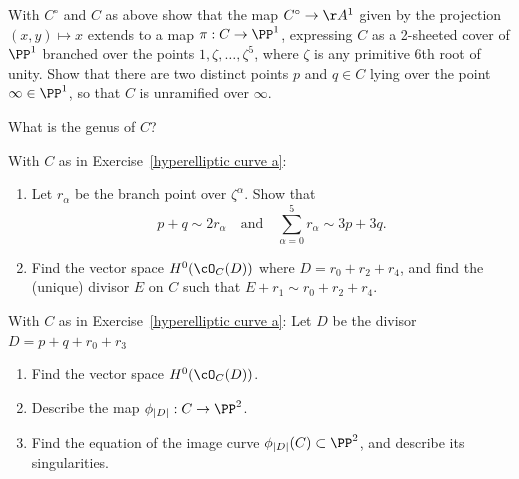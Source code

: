 \begin{exercise}\label{hyperelliptic curve a}
With $C^\circ$ and $C$  as above show  that the map $C^\circ \to \AA^1$ given by the projection $(x,y) \mapsto x$ extends to a map $\pi : C \to \PP^1$, expressing $C$ as a 2-sheeted cover of $\PP^1$ branched over the points $1, \zeta, \dots, \zeta^5$, where $\zeta$ is any primitive 6th root of unity. Show that there are two distinct points $p$ and $q \in C$  lying over the point $\infty \in \PP^1$,
so that $C$ is unramified over $\infty$.

What is the genus of $C$?
\end{exercise}

\begin{exercise} With $C$ as in Exercise~\ref{hyperelliptic curve a}:
\begin{enumerate}

\item Let $r_\alpha$ be the branch point over $\zeta^\alpha$. Show that
$$
p+q \sim 2r_\alpha \quad \text{and} \quad \sum_{\alpha = 0}^5 r_\alpha \sim 3p+3q.
$$

\item Find the vector space $H^0(\cO_C(D))$ where $D = r_0 + r_2 + r_4$, and find the (unique) divisor $E$ on $C$ such that $E + r_1 \sim r_0 + r_2 + r_4$.

\end{enumerate}

\end{exercise}

\begin{exercise}
With $C$ as in Exercise~\ref{hyperelliptic curve a}:
Let $D$ be the divisor $D = p + q + r_0 + r_3$
\begin{enumerate}
\item Find the vector space $H^0(\cO_C(D))$.
\item Describe the map $\phi_{|D|} : C \to \PP^2$.
\item Find the equation of the image curve $\phi_{|D|}(C) \subset \PP^2$, and describe its singularities.
\end{enumerate}
\end{exercise}
 
